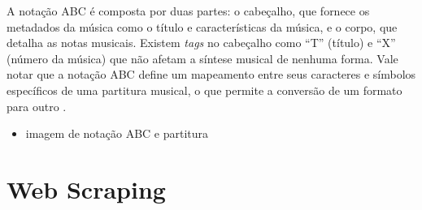 \documentclass{automatextcc}
\begin{document}
A notação ABC é composta por duas partes: o cabeçalho, que fornece os metadados da música como o título e características da música, e o corpo, que detalha as notas musicais. Existem \textit{tags} no cabeçalho como ``T'' (título) e ``X'' (número da música) que não afetam a síntese musical de nenhuma forma. Vale notar que a notação ABC define um mapeamento entre seus caracteres e símbolos específicos de uma partitura musical, o que permite a conversão de um formato para outro \citep{agarwala2017}. 

\begin{itemize}
    \item imagem de notação ABC e partitura
\end{itemize}


\section{Web Scraping}


\end{document}
